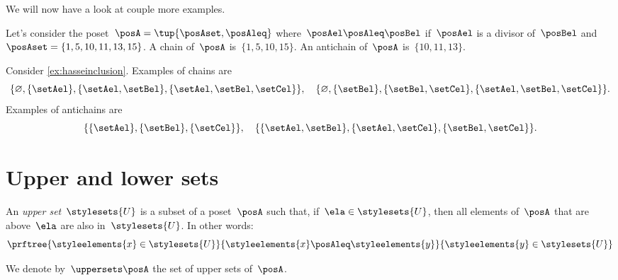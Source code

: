 We will now have a look at couple more examples.
\begin{example}
    Let's consider the poset~$\posA=\tup{\posAset,\posAleq}$ where~$\posAel \posAleq \posBel$ if~$\posAel$ is a divisor of~$\posBel$ and~$\posAset=\{1,5,10,11,13,15\}$.
    A chain of~$\posA$ is~$\{1,5,10,15\}$.
An antichain of~$\posA$ is~$\{10,11,13\}$.
\end{example}

\begin{example}
    Consider \cref{ex:hasseinclusion}.
Examples of chains are
    \begin{equation}
        \{\varnothing,\{\setAel\},\{\setAel,\setBel\},\{\setAel,\setBel,\setCel\}\}, \quad  \{\varnothing,\{\setBel\},\{\setBel,\setCel\},\{\setAel,\setBel,\setCel\}\}.
    \end{equation}
    Examples of antichains are
    \begin{equation}
        \{\{\setAel\},\{\setBel\},\{\setCel\}\}, \quad \{ \{\setAel,\setBel\},\{\setAel,\setCel\}, \{\setBel,\setCel\}\}.
    \end{equation}
\end{example}


\section{Upper and lower sets}
\label{sec:UpperLowerSets}


\begin{definition}
    \label{def:upperset}
    An \emph{upper set}~$\stylesets{U}$ is a subset of a poset~$\posA$ such
    that, if~$\ela \in \stylesets{U}$, then all elements of~$\posA$ that are above~$\ela$ are also in~$\stylesets{U}$.
    In other words:
    \begin{equation}
        \prftree{\styleelements{x}\in \stylesets{U}}{\styleelements{x}\posAleq \styleelements{y}}{\styleelements{y}\in \stylesets{U}}
    \end{equation}
\end{definition}
We denote by~$\uppersets \posA$ the set of upper sets of~$\posA$.

